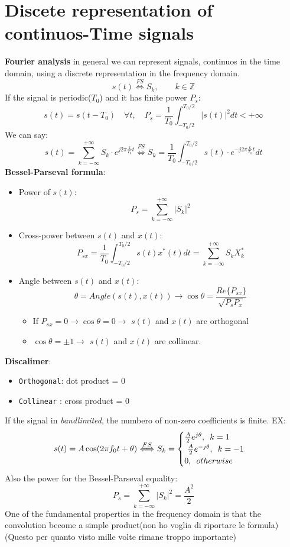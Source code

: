 \section{Discete representation of continuos-Time signals}
\textbf{Fourier analysis} in general we can represent signals, continuos in the time domain, using a discrete representation in the frequency domain.
\[s(t) \overset{FS}{\Longleftrightarrow} S_k, \hspace{2em} k\in \mathbb{Z} \]
If the signal is periodic(\(T_0\)) and it has finite power \(P_s\):
\[s(t)=s(t-T_0)\hspace{1em}\forall t, \hspace{1em}P_s =\frac{1}{T_0}\int_{-T_0/2}^{T_0/2}|s(t)|^2 dt <+\infty\]
We can say:
\[s(t)=\sum_{k=-\infty}^{+\infty} S_k\cdot e^{j2\pi\frac{k}{T_0}t}\overset{FS}{\Longleftrightarrow}S_k=\frac{1}{T_0}\int_{-T_0/2}^{T_0/2}s(t)\cdot e^{-j2\pi\frac{k}{T_0}t}dt\]
\textbf{Bessel-Parseval formula}:
\begin{itemize}
    \item Power of \(s(t)\):\[P_s=\sum_{k=-\infty}^{+\infty}|S_k|^2\]
    \item Cross-power between \(s(t)\) and \(x(t)\): \[P_{sx}=\frac{1}{T_0}\int_{-T_0/2}^{T_0/2}s(t)x^*(t)dt=\sum_{k=-\infty}^{+\infty}S_kX_k^*\]
    \item Angle between \(s(t)\) and \(x(t)\):
    \[\theta= Angle(s(t),x(t))\rightarrow\cos\theta=\frac{Re\{P_{sx}\}}{\sqrt{P_sP_x}}\]
    \begin{itemize}
        \item If \(P_{sx}=0\rightarrow\cos\theta=0\rightarrow\) \(s(t)\) and \(x(t)\) are orthogonal
        \item \(\cos\theta =\pm 1\rightarrow\) \(s(t)\) and \(x(t)\) are collinear.
    \end{itemize}
\end{itemize}
\textbf{Discalimer}:
\begin{itemize}
    \item \texttt{Orthogonal}: dot product = 0
    \item \texttt{Collinear} : cross product = 0
\end{itemize}

If the signal in \textit{bandlimited}, the numbero of non-zero coefficients is finite.
EX:
\[
s(t)=A\cos(2\pi f_0t+\theta)\overset{FS}{\Longleftrightarrow}S_k=\begin{cases}
    \frac{A}{2}e^{j\theta}, \hspace{0.5em}k=1\\
    \ \frac{A}{2} e^{-j\theta}, \hspace{0.5em}k=-1\\
    0, \hspace{0.5em}{otherwise}
\end{cases}
\]
Also the power for the Bessel-Parseval equality:
\[
P_s=\sum_{k=-\infty}^{+\infty}|S_k|^2=\frac{A^2}{2}
\]
One of the fundamental properties in the frequency domain is that the convolution become a simple product(non ho voglia di riportare le formula)
(Questo per quanto visto mille volte rimane troppo importante)
